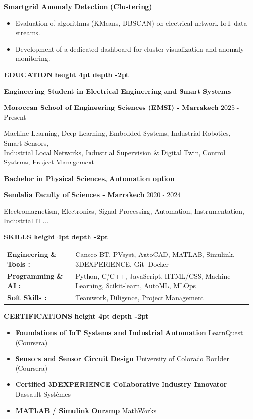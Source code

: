 \documentclass[10pt,a4paper]{altacv}
\renewcommand{\cvsection}[2][]{%
  \vspace{3pt}%
  {\color{heading}\LARGE\bfseries #2 \hspace{0.2em}\leaders\vrule height 4pt depth -2pt\hfill\mbox{}}\par\vspace{2pt}
}
\renewcommand{\cvevent}[4]{%
  {\large\bfseries\color{accent}#1\par}
  \smallskip\normalsize
  \ifstrequal{#2}{}{}{%
    \textbf{\color{emphasis}#2\ifstrequal{#4}{}{}{ - #4}}%
  }%
  \hfill
  \ifstrequal{#3}{}{}{{\small#3}}%
  \par\smallskip
}
\begin{document}
{\large\bfseries\color{accent} Smartgrid Anomaly Detection (Clustering)}\\[0.05cm]
\begin{itemize}
  \item Evaluation of algorithms (KMeans, DBSCAN) on electrical network IoT data streams.
  \item Development of a dedicated dashboard for cluster visualization and anomaly monitoring.
\end{itemize}

\cvsection{EDUCATION}
\cvevent{Engineering Student in Electrical Engineering and Smart Systems}{Moroccan School of Engineering Sciences (EMSI)}{2025 - Present}{Marrakech}
\small Machine Learning, Deep Learning, Embedded Systems, Industrial Robotics, Smart Sensors,\\
\small Industrial Local Networks, Industrial Supervision \& Digital Twin, Control Systems, Project Management...

\cvevent{Bachelor in Physical Sciences, Automation option}{Semlalia Faculty of Sciences}{2020 - 2024}{Marrakech}
\small Electromagnetism, Electronics, Signal Processing, Automation, Instrumentation, Industrial IT...

\cvsection{SKILLS}
\begin{tabular}{@{}ll@{}}
\textbf{Engineering \& Tools :} & Caneco BT, PVsyst, AutoCAD, MATLAB, Simulink, 3DEXPERIENCE, Git, Docker \\[2pt]
\textbf{Programming \& AI :} & Python, C/C++, JavaScript, HTML/CSS, Machine Learning, Scikit-learn, AutoML, MLOps \\[2pt]
\textbf{Soft Skills :} & Teamwork, Diligence, Project Management \\
\end{tabular}

\cvsection{CERTIFICATIONS}
\begin{itemize}[leftmargin=*, label=\textbullet, itemsep=2pt]
  \item \textbf{Foundations of IoT Systems and Industrial Automation} \hfill {\color{emphasis}LearnQuest (Coursera)}
  \item \textbf{Sensors and Sensor Circuit Design} \hfill {\color{emphasis}University of Colorado Boulder (Coursera)}
  \item \textbf{Certified 3DEXPERIENCE Collaborative Industry Innovator} \hfill {\color{emphasis}Dassault Systèmes}
  \item \textbf{MATLAB / Simulink Onramp} \hfill {\color{emphasis}MathWorks}
\end{itemize}
\end{document}
